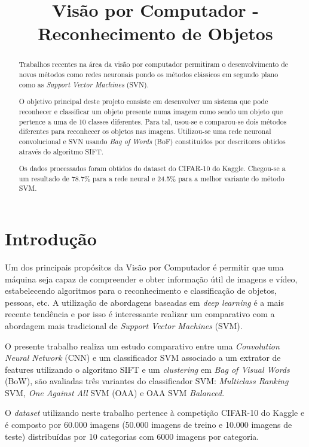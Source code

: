 \documentclass[extendedabs]{vcom}
\title{Visão por Computador - Reconhecimento de Objetos}
\begin{document}
\maketitle

\begin{abstract}
Trabalhos recentes na área da visão por computador permitiram o desenvolvimento de novos métodos como redes neuronais pondo os métodos clássicos em segundo plano como as \textit{Support Vector Machines} (SVN). 

O objetivo principal deste projeto consiste em desenvolver um sistema que pode reconhecer e classificar um objeto presente numa imagem como sendo um objeto que pertence a uma de 10 classes diferentes. Para tal, usou-se e comparou-se dois métodos diferentes para reconhecer os objetos nas imagens. Utilizou-se uma rede neuronal convolucional e SVN usando \textit{Bag of Words} (BoF) constituídos por descritores obtidos através do algoritmo SIFT. 

Os dados processados foram obtidos do dataset do CIFAR-10 do Kaggle. Chegou-se a um resultado de 78.7\% para a rede neural e 24.5\% para a melhor variante do método SVM.
\end{abstract}

\section{Introdução}
\label{sec:intro}
Um dos principais propósitos da Visão por Computador é permitir que uma máquina seja capaz de compreender e obter informação útil de imagens e vídeo, estabelecendo algoritmos para o reconhecimento e classificação de objetos, pessoas, etc. A utilização de abordagens baseadas em \textit{deep learning} é a mais recente tendência e por isso é interessante realizar um comparativo com a abordagem mais tradicional de \textit{Support Vector Machines} (SVM). 

O presente trabalho realiza um estudo comparativo entre uma \textit{Convolution Neural Network} (CNN) e um classificador SVM associado a um extrator de features utilizando o algoritmo SIFT e um \textit{clustering} em \textit{Bag of Visual Words} (BoW), são avaliadas três variantes do classificador SVM: \textit{Multiclass Ranking} SVM, \textit{One Against All} SVM (OAA) e OAA SVM \textit{Balanced}. 

O \textit{dataset} utilizando neste trabalho pertence à competição CIFAR-10 do Kaggle e é composto por 60.000 imagens (50.000 imagens de treino e 10.000 imagens de teste) distribuídas por 10 categorias com 6000 imagens por categoria.
\end{document}
